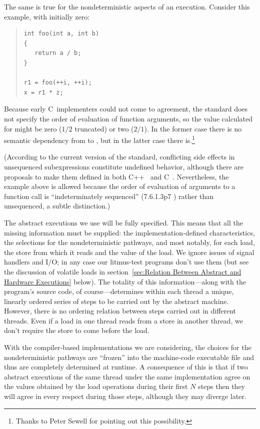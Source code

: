 \documentclass[10]{article}
\begin{document}
The same is true for the nondeterministic aspects of an execution.
Consider this example, with  initially zero:
\begin{quote}
\begin{verbatim}
int foo(int a, int b)
{
   return a / b;
}

r1 = foo(++i, ++i);
x = r1 * z;
\end{verbatim}
\end{quote}
Because early C~implementers could not come to agreement, the standard
does not specify the order of evaluation of function arguments, so
the value calculated for  might be zero ($1/2$ truncated) or two
($2/1$).
In the former case there is no semantic dependency from  to ,
but in the latter case there is.\footnote{
	Thanks to Peter Sewell for pointing out this possibility.}

(According to the current version of the standard, conflicting side effects
in unsequenced subexpressions constitute undefined behavior,
although there are proposals to make them defined in both
C++~\cite{GabrielDosReis2016P0145r3}
and C~\cite{AlexCeleste2023N3203}.
Nevertheless, the example above is allowed because the order of evaluation
of arguments to a function call is ``indeterminately sequenced''
(7.6.1.3p7 ) rather than unsequenced, a subtle distinction.)

\medskip

The abstract executions we use will be fully specified.
This means that all the missing information must be supplied:
the implementation-defined characteristics, the selections for the
nondeterministic pathways, and most notably, for each load, the store
from which it reads and the value of the load.
We ignore issues of signal handlers and I/O;
in any case our litmus-test programs don't use them
(but see the discussion of volatile loads in
section~\ref{sec:Relation Between Abstract and Hardware Executions} below).
The totality of this information---along with the program's source
code, of course---determines within each thread a unique, linearly
ordered series of steps to be carried out by the abstract machine.
However, there is no ordering relation between steps carried out
in different threads.  Even if a load in one thread reads from a
store in another thread, we don't require the store to come before
the load.

With the compiler-based implementations we are considering,
the choices for the nondeterministic pathways are ``frozen'' into the
machine-code executable file and thus are completely determined
at runtime.
A consequence of this is that if two abstract executions of the same
thread under the same implementation agree on the values obtained by
the load operations during their first $N$ steps then they will agree
in every respect during those steps, although they may diverge later.
\end{document}
